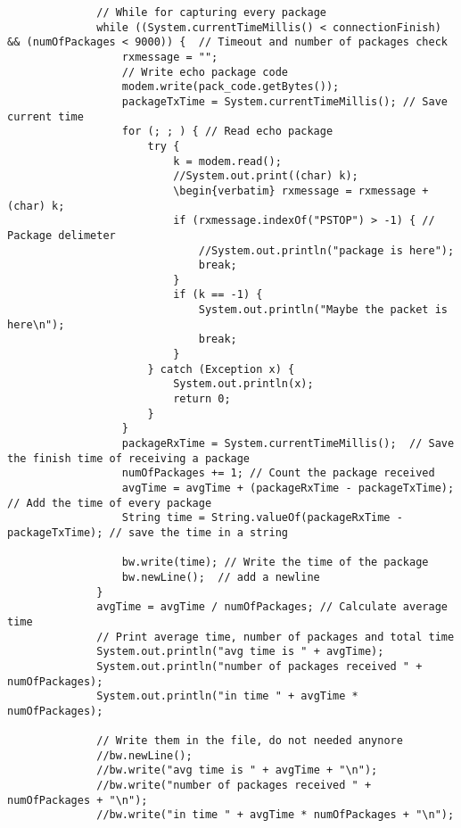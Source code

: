 \documentclass[10pt,a4paper]{article}
\begin{document}
\begin{lstlisting}
              // While for capturing every package
              while ((System.currentTimeMillis() < connectionFinish)  && (numOfPackages < 9000)) {  // Timeout and number of packages check
                  rxmessage = "";
                  // Write echo package code
                  modem.write(pack_code.getBytes());
                  packageTxTime = System.currentTimeMillis(); // Save current time
                  for (; ; ) { // Read echo package
                      try {
                          k = modem.read();
                          //System.out.print((char) k);
                          \begin{verbatim} rxmessage = rxmessage + (char) k;
                          if (rxmessage.indexOf("PSTOP") > -1) { // Package delimeter
                              //System.out.println("package is here");
                              break;
                          }
                          if (k == -1) {
                              System.out.println("Maybe the packet is here\n");
                              break;
                          }
                      } catch (Exception x) {
                          System.out.println(x);
                          return 0;
                      }
                  }
                  packageRxTime = System.currentTimeMillis();  // Save the finish time of receiving a package
                  numOfPackages += 1; // Count the package received
                  avgTime = avgTime + (packageRxTime - packageTxTime);  // Add the time of every package
                  String time = String.valueOf(packageRxTime - packageTxTime); // save the time in a string
  
                  bw.write(time); // Write the time of the package
                  bw.newLine();  // add a newline
              }
              avgTime = avgTime / numOfPackages; // Calculate average time
              // Print average time, number of packages and total time
              System.out.println("avg time is " + avgTime);
              System.out.println("number of packages received " + numOfPackages);
              System.out.println("in time " + avgTime * numOfPackages);
  
              // Write them in the file, do not needed anynore
              //bw.newLine();
              //bw.write("avg time is " + avgTime + "\n");
              //bw.write("number of packages received " + numOfPackages + "\n");
              //bw.write("in time " + avgTime * numOfPackages + "\n");
  

\end{lstlisting}
\end{document}
